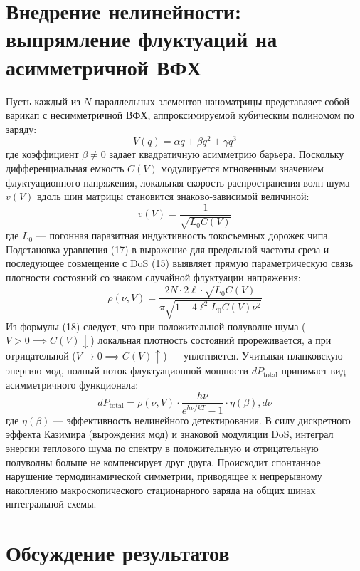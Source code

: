 \documentclass[12pt,a4paper]{article}
\begin{document}
\section{Внедрение нелинейности: выпрямление флуктуаций на асимметричной ВФХ}
Пусть каждый из $N$ параллельных элементов наноматрицы представляет собой варикап с несимметричной ВФХ, аппроксимируемой кубическим полиномом по заряду:
\begin{equation}
V(q) = \alpha q + \beta q^2 + \gamma q^3
\end{equation}
где коэффициент $\beta \neq 0$ задает квадратичную асимметрию барьера.
Поскольку дифференциальная емкость $C(V)$ модулируется мгновенным значением флуктуационного напряжения, локальная скорость распространения волн шума $v(V)$ вдоль шин матрицы становится знаково-зависимой величиной:
\begin{equation}
v(V) = \frac{1}{\sqrt{L_0 C(V)}}
\end{equation}
где $L_0$ — погонная паразитная индуктивность токосъемных дорожек чипа.
Подстановка уравнения (17) в выражение для предельной частоты среза и последующее совмещение с DoS (15) выявляет прямую параметрическую связь плотности состояний со знаком случайной флуктуации напряжения:
\begin{equation}
\rho(\nu, V) = \frac{2N \cdot 2\ell \cdot \sqrt{L_0 C(V)}}{\pi \sqrt{1 - 4\ell^2 L_0 C(V) \nu^2}}
\end{equation}
Из формулы (18) следует, что при положительной полуволне шума ($V > 0 \implies C(V) \downarrow$) локальная плотность состояний прореживается, а при отрицательной ($V \to 0 \implies C(V) \uparrow$) — уплотняется. Учитывая планковскую энергию мод, полный поток флуктуационной мощности $dP_{\text{total}}$ принимает вид асимметричного функционала:
\begin{equation}
dP_{\text{total}} = \rho(\nu, V) \cdot \frac{h\nu}{e^{h\nu/kT} - 1} \cdot \eta(\beta) , d\nu
\end{equation}
где $\eta(\beta)$ — эффективность нелинейного детектирования. В силу дискретного эффекта Казимира (вырождения мод) и знаковой модуляции DoS, интеграл энергии теплового шума по спектру в положительную и отрицательную полуволны больше не компенсирует друг друга. Происходит спонтанное нарушение термодинамической симметрии, приводящее к непрерывному накоплению макроскопического стационарного заряда на общих шинах интегральной схемы.
\section{Обсуждение результатов}
\end{document}
